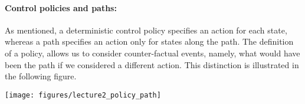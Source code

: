 %

\paragraph{Control policies and paths:}
As mentioned, a deterministic control policy specifies an action for each state,
whereas a path specifies an action only for states along the path.
The definition of a policy, allows us to consider counter-factual
events, namely, what would have been the path if we considered a
different action. This distinction is illustrated in the following
figure.

\begin{centering}
\texttt{[image: figures/lecture2\_policy\_path]}\\
\end{centering}

